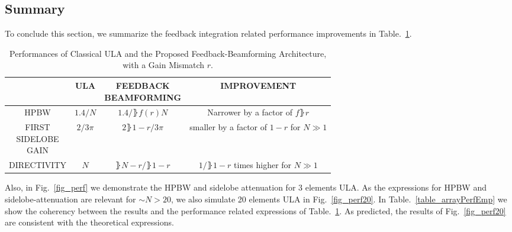 \subsection{Summary}
To conclude this section, we summarize the feedback integration related performance improvements in Table.~\ref{table_arrayPerformance}.
\begin{table}[h!]
    \caption{Performances of Classical ULA and the Proposed Feedback-Beamforming Architecture, with a Gain Mismatch $r$.}
    \centering
    {
        \begin{tabular}{||c c c c||}
            \hline
            & ULA & \thead{FEEDBACK\\BEAMFORMING} & IMPROVEMENT \\ [0.5ex] 
            \hline\hline
            HPBW & $ 1.4/N$ & $1.4/\rBrace{f(r)N}$ & Narrower by a factor of $f\rBrace{r}$\\ 
            \thead{FIRST\\SIDELOBE\\GAIN} & $2/3\pi$ & $2\rBrace{1-r}/3\pi$ & \thead{smaller by a factor of $1-r$\\for $N\gg{}1$} \\
            DIRECTIVITY & $N$ & $\rBrace{N-r}/\rBrace{1-r}$ & \thead{$1/\rBrace{1-r}$ times higher \\ for $N\gg{}1$}\\
            [1ex] 
            \hline
         \end{tabular}
     }
    \label{table_arrayPerformance}
\end{table}
Also, in Fig.~\ref{fig_perf} we demonstrate the HPBW and sidelobe attenuation for 3 elements ULA.
As the expressions for HPBW and sidelobe-attenuation are relevant for $\sim{}N>20$, we also simulate 20 elements ULA in Fig.~\ref{fig_perf20}. 
In Table.~\ref{table_arrayPerfEmp} we show the coherency between the results and the performance related expressions of Table.~\ref{table_arrayPerformance}.
As predicted, the results of Fig.~\ref{fig_perf20} are consistent with the theoretical expressions.
